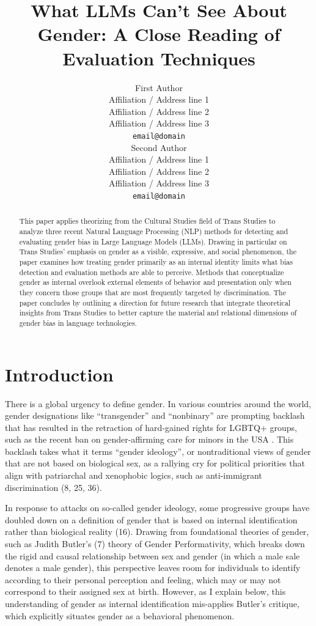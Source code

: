 \documentclass[11pt]{article}
\title{What LLMs Can't See About Gender: A Close Reading of Evaluation Techniques}
\author{First Author \\
  Affiliation / Address line 1 \\
  Affiliation / Address line 2 \\
  Affiliation / Address line 3 \\
  \texttt{email@domain} \\\And
  Second Author \\
  Affiliation / Address line 1 \\
  Affiliation / Address line 2 \\
  Affiliation / Address line 3 \\
  \texttt{email@domain} \\}
\begin{document}
\maketitle
\begin{abstract}
This paper applies theorizing from the Cultural Studies field of Trans Studies to analyze three recent Natural Language Processing (NLP) methods for detecting and evaluating gender bias in Large Language Models (LLMs). Drawing in particular on Trans Studies’ emphasis on gender as a visible, expressive, and social phenomenon, the paper examines how treating gender primarily as an internal identity limits what bias detection and evaluation methods are able to perceive. Methods that conceptualize gender as internal overlook external  elements of behavior and presentation only when they concern those groups that are most frequently targeted by discrimination. The paper concludes by outlining a direction for future research that integrate theoretical insights from Trans Studies to better capture the material and relational dimensions of gender bias in language technologies.

\end{abstract}

\section{Introduction}
There is a global urgency to define gender. In various countries around the world, gender designations like “transgender” and “nonbinary” are prompting backlash that has resulted in the retraction of hard-gained rights for LGBTQ+ groups, such as the recent ban on gender-affirming care for minors in the USA \citep{karni:2025}. This backlash takes what it terms “gender ideology”, or nontraditional views of gender that are not based on biological sex, as a rallying cry for political priorities that align with patriarchal and xenophobic logics, such as anti-immigrant discrimination (8, 25, 36).

In response to attacks on so-called gender ideology, some progressive groups have doubled down on a definition of gender that is based on internal identification rather than biological reality (16). Drawing from foundational theories of gender, such as Judith Butler’s (7) theory of Gender Performativity, which breaks down the rigid and causal relationship between sex and gender (in which a male sale denotes a male gender), this perspective leaves room for individuals to identify according to their personal perception and feeling, which may or may not correspond to their assigned sex at birth. However, as I explain below, this understanding of gender as internal identification mis-applies Butler’s critique, which explicitly situates gender as a behavioral phenomenon.
\end{document}
